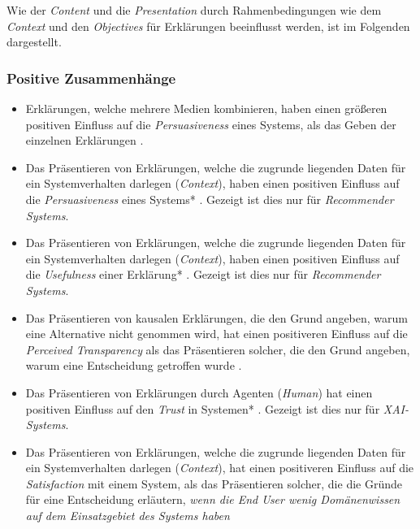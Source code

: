 Wie der \textit{Content} und die \textit{Presentation} durch Rahmenbedingungen wie dem \textit{Context} und den \textit{Objectives} für Erklärungen beeinflusst werden, ist im Folgenden dargestellt.

\subsubsection*{Positive Zusammenhänge}

\begin{itemize}
    \item Erklärungen, welche mehrere Medien kombinieren, haben einen größeren positiven Einfluss auf die \textit{Persuasiveness} eines Systems, als das Geben der einzelnen Erklärungen  \cite{sato_action-triggering_2019, kunkel_let_2019, sato_action-triggering_2019, schrills_color_2020, lim_2009_assessing}.
    \item Das Präsentieren von Erklärungen, welche die zugrunde liegenden Daten für ein Systemverhalten darlegen (\textit{Context}), haben einen positiven Einfluss auf die \textit{Persuasiveness} eines Systems* \cite{sato_action-triggering_2019, abdulrahman_belief-based_2019}. Gezeigt ist dies nur für \textit{Recommender Systems}.
    \item Das Präsentieren von Erklärungen, welche die zugrunde liegenden Daten für ein Systemverhalten darlegen (\textit{Context}), haben einen positiven Einfluss auf die \textit{Usefulness} einer Erklärung* \cite{sato_action-triggering_2019, abdulrahman_belief-based_2019}. Gezeigt ist dies nur für \textit{Recommender Systems}.
    \item Das Präsentieren von kausalen Erklärungen, die den Grund angeben, warum eine Alternative nicht genommen wird, hat einen positiveren Einfluss auf die \textit{Perceived Transparency} als das Präsentieren solcher, die den Grund angeben, warum eine Entscheidung getroffen wurde \cite{martin_evaluating_2021, schrills_color_2020, neerincx_using_2018}.
    \item Das Präsentieren von Erklärungen durch Agenten (\textit{Human}) hat einen positiven Einfluss auf den \textit{Trust} in Systemen* \cite{weitz_you_2019}. Gezeigt ist dies nur für \textit{XAI-Systems}.
    \item Das Präsentieren von Erklärungen, welche die zugrunde liegenden Daten für ein Systemverhalten darlegen (\textit{Context}), hat einen positiveren Einfluss auf die \textit{Satisfaction} mit einem System, als das Präsentieren solcher, die die Gründe für eine Entscheidung erläutern, \textit{wenn die End User wenig Domänenwissen auf dem Einsatzgebiet des Systems haben} \cite{kaptein_personalised_2017, martin_evaluating_2021}

\end{itemize}
